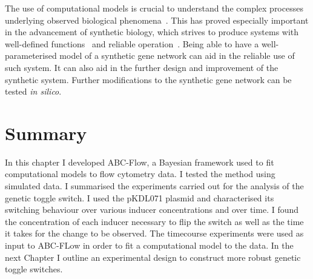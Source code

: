 

The use of computational models is crucial to understand the complex processes underlying observed biological phenomena~\autocite{Lillacci:2013hu}. This has proved especially important in the advancement of synthetic biology, which strives to produce systems with well-defined functions~\autocite{Chin:2006fb} and reliable operation~\autocite{Lu:2009ez}. Being able to have a well-parameterised model of a synthetic gene network can aid in the reliable use of such system. It can also aid in the further design and improvement of the synthetic system. Further modifications to the synthetic gene network can be tested \textit{in silico}. 





\section{Summary}


In this chapter I developed ABC-Flow, a Bayesian framework used to fit computational models to flow cytometry data. I tested the method using simulated data. I summarised the experiments carried out for the analysis of the genetic toggle switch. I used the pKDL071 plasmid and characterised its switching behaviour over various inducer concentrations and over time. I found the concentration of each inducer necessary to flip the switch as well as the time it takes for the change to be observed. The timecourse experiments were used as input to ABC-FLow in order to fit a computational model to the data. In the next Chapter I outline an experimental design to construct more robust genetic toggle switches.







 
 